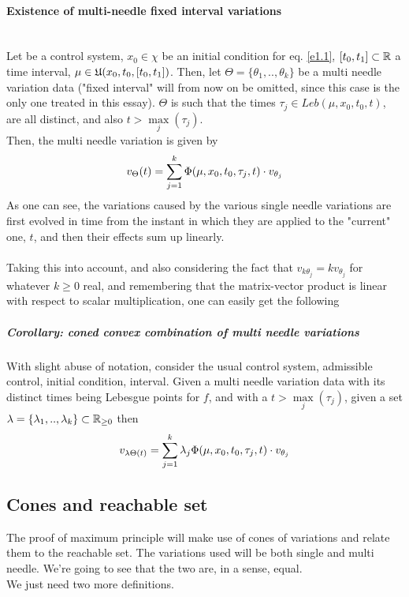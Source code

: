 \paragraph[4.12]{Existence of multi-needle fixed interval variations}\mbox{}\\
 Let \controlSystem\space be a control system, $x_0\in\chi$ be an initial condition for eq. \eqref{e1.1}, $[t_0,t_1]\subset\mathbb{R}$ a time interval, $\mu\in\mathfrak{U}(x_0,t_0,[t_0,t_1])$. Then, let $\Theta=\{\theta_1,..,\theta_k\}$ be a multi needle variation data ("fixed interval" will from now on be omitted, since this case is the only one treated in this essay). $\Theta$ is such that the times $\tau_j\in Leb(\mu,x_0,t_0,t)$, are all distinct, and also $t>\underset{j}{\max}(\tau_j)$.\\
Then, the multi needle variation is given by
\[v_\Theta(t)=\sum_{j=1}^{k}\Phi(\mu,x_0,t_0,\tau_j,t)\cdot v_{\theta_j} \]
As one can see, the variations caused by the various single needle variations are first evolved in time from the instant in which they are applied to the "current" one, $t$, and then their effects sum up linearly.\\\\
Taking this into account, and also considering the fact that $v_{k\theta_j}=kv_{\theta_j}$ for whatever $k\geq0$ real, and remembering that the matrix-vector product is linear with respect to scalar multiplication, one can easily get the following
\subparagraph[4.13]{Corollary: coned convex combination of multi needle variations} With slight abuse of notation, consider the usual control system, admissible control, initial condition, interval. Given a multi needle variation data with its distinct times being Lebesgue points for $f$, and with a $t>\underset{j}{\max}(\tau_j)$, given a set $\lambda=\{\lambda_1,..,\lambda_k\}\subset\mathbb{R}_{\geq0}$ then
\[ v_{\lambda\Theta(t)}=\sum_{j=1}^{k}\lambda_j\Phi(\mu,x_0,t_0,\tau_j,t)\cdot v_{\theta_j} \]


\subsection{Cones and reachable set}
The proof of maximum principle will make use of cones of variations and relate them to the reachable set. The variations used will be both single and multi needle. We're going to see that the two are, in a sense, equal.\\ We just need two more definitions.\\ 


